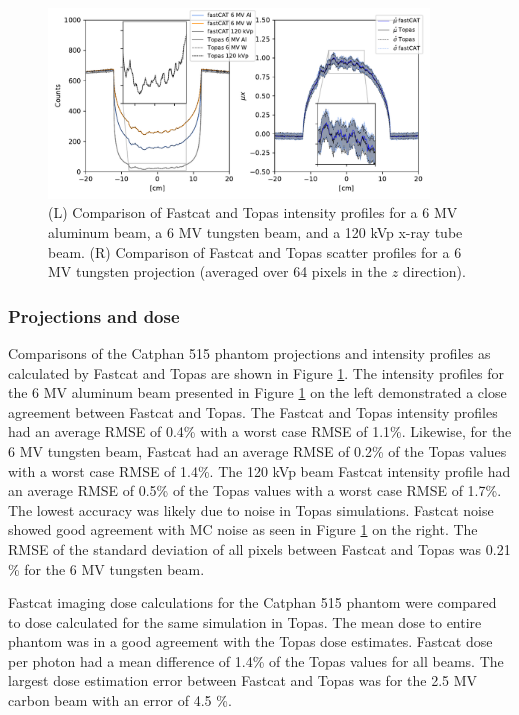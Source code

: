 \begin{figure}[ht!]
   \begin{center}
   \includegraphics[width=0.9\textwidth,trim={0 0 0 0},clip]{figures/one_slice_comparison_2panel.pdf}
   \caption{
   (L) Comparison of Fastcat and Topas intensity profiles for a 6 MV aluminum beam, a 6 MV tungsten beam, and a 120 kVp x-ray tube beam. (R) Comparison of Fastcat and Topas scatter profiles for a 6 MV tungsten projection (averaged over 64 pixels in the $z$ direction).
   \label{one_slice_comparison} 
    }  %
    \end{center}
\end{figure}

\subsubsection{Projections and dose}

Comparisons of the Catphan 515 phantom projections and intensity profiles as calculated by Fastcat and Topas are shown in Figure \ref{one_slice_comparison}. The intensity profiles for the 6 MV aluminum beam presented in Figure \ref{one_slice_comparison} on the left demonstrated a close agreement between Fastcat and Topas. The Fastcat and Topas intensity profiles had an average RMSE of 0.4\% with a worst case RMSE of 1.1\%.  Likewise, for the 6 MV tungsten beam, Fastcat had an average RMSE of 0.2\% of the Topas values with a worst case RMSE of 1.4\%. The 120 kVp beam Fastcat  intensity profile had an average RMSE of 0.5\% of the Topas values with a worst case RMSE of 1.7\%. The lowest accuracy was likely due to noise in Topas simulations. Fastcat noise showed good agreement with MC noise as seen in Figure \ref{one_slice_comparison} on the right. The RMSE of the standard deviation of all pixels between Fastcat and Topas was 0.21 \% for the 6 MV tungsten beam.

Fastcat imaging dose calculations for the Catphan 515 phantom were compared to dose calculated for the same simulation in Topas. The mean dose to entire phantom was in a good agreement with the Topas dose estimates. Fastcat dose per photon had a mean difference of 1.4\% of the Topas values for all beams. The largest dose estimation error between Fastcat and Topas was for the 2.5 MV carbon beam with an error of 4.5 \%.

